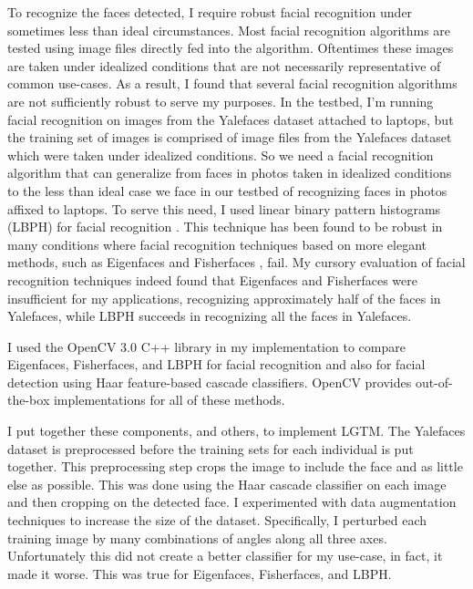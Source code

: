 \documentclass[12pt]{report}
\begin{document}
To recognize the faces detected, I require robust facial recognition under sometimes less than ideal circumstances. Most facial recognition algorithms are tested using image files directly fed into the algorithm. Oftentimes these images are taken under idealized conditions that are not necessarily representative of common use-cases. As a result, I found that several facial recognition algorithms are not sufficiently robust to serve my purposes. In the testbed, I'm running facial recognition on images from the Yalefaces dataset attached to laptops, but the training set of images is comprised of image files from the Yalefaces \cite{FisherfacesBelhumeur1997} dataset which were taken under idealized conditions. So we need a facial recognition algorithm that can generalize from faces in photos taken in idealized conditions to the less than ideal case we face in our testbed of recognizing faces in photos affixed to laptops. To serve this need, I used linear binary pattern histograms (LBPH) for facial recognition \cite{LBPHAhonen2004,LearningMultiScalBlockLBPHLiao2007}. This technique has been found to be robust in many conditions where facial recognition techniques based on more elegant methods, such as Eigenfaces \cite{EigenfacesTurk1991} and Fisherfaces \cite{FisherfacesBelhumeur1997}, fail. My cursory evaluation of facial recognition techniques indeed found that Eigenfaces and Fisherfaces were insufficient for my applications, recognizing approximately half of the faces in Yalefaces, while LBPH succeeds in recognizing all the faces in Yalefaces. \par

I used the OpenCV 3.0 \cite{OpenCV} C++ library in my implementation to compare Eigenfaces, Fisherfaces, and LBPH for facial recognition and also for facial detection using Haar feature-based cascade classifiers. OpenCV provides out-of-the-box implementations for all of these methods. \par

I put together these components, and others, to implement LGTM. The Yalefaces dataset is preprocessed before the training sets for each individual is put together. This preprocessing step crops the image to include the face and as little else as possible. This was done using the Haar cascade classifier on each image and then cropping on the detected face. I experimented with data augmentation techniques to increase the size of the dataset. Specifically, I perturbed each training image by many combinations of angles along all three axes. Unfortunately this did not create a better classifier for my use-case, in fact, it made it worse. This was true for Eigenfaces, Fisherfaces, and LBPH. \par
\end{document}
